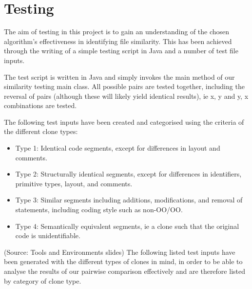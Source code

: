 \section{Testing}
The aim of testing in this project is to gain an understanding of the chosen algorithm's effectiveness in identifying file similarity. This has been achieved through the writing of a simple testing script in Java and a number of test file inputs.

The test script is written in Java and simply invokes the main method of our similarity testing main class. All possible pairs are tested together, including the reversal of pairs (although these will likely yield identical results), ie x, y and y, x combinations are tested.  

The following test inputs have been created and categorised using the criteria of the different clone types:
\begin{itemize}
\item Type 1: Identical code segments, except for differences in layout and comments.
\item Type 2: Structurally identical segments, except for differences in identifiers, primitive types, layout, and comments.
\item Type 3: Similar segments including additions, modifications, and removal of statements, including coding style such as non-OO/OO.
\item Type 4: Semantically equivalent segments, ie a clone such that the original code is unidentifiable.
\end{itemize}
(Source: Tools and Environments slides)
The following listed test inputs have been generated with the different types of clones in mind, in order to be able to analyse the results of our pairwise comparison effectively and are therefore listed by category of clone type.
